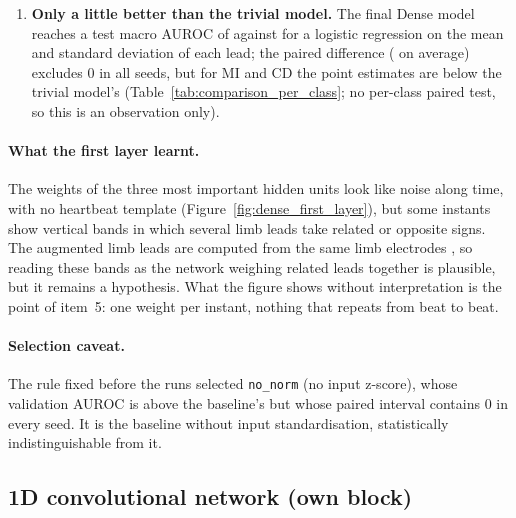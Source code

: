 \begin{enumerate}[leftmargin=1.4em,itemsep=2pt]
        loss reaches its minimum early and then rises, while the AUROC keeps improving for several
        more epochs. The network keeps ranking the records better while its probabilities become
        over-confident. Early stopping on the AUROC therefore stops later than a rule based on the
        loss would.
  \item \textbf{Only a little better than the trivial model.} The final Dense model reaches a test
        macro AUROC of \denseFinalTestMacroAurocMean{} against \trivialTestMacroAuroc{} for a logistic
        regression on the mean and standard deviation of each lead; the paired difference
        (\denseDiffTrivialMean{} on average) excludes 0 in all seeds, but for MI and CD the point
        estimates are below the trivial model's (Table~\ref{tab:comparison_per_class}; no per-class
        paired test, so this is an observation only).
\end{enumerate}

\paragraph{What the first layer learnt.} The weights of the three most important hidden units look
like noise along time, with no heartbeat template (Figure~\ref{fig:dense_first_layer}), but some
instants show vertical bands in which several limb leads take related or opposite signs. The
augmented limb leads are computed from the same limb electrodes \cite[p.~e263]{wagner2009aha}, so
reading these bands as the network weighing related leads together is plausible, but it remains a
hypothesis. What the figure shows without interpretation is the point of item~5: one weight per
instant, nothing that repeats from beat to beat.



\paragraph{Selection caveat.} The rule fixed before the runs selected \texttt{no\_norm}
(no input z-score), whose validation AUROC is above the baseline's but whose paired interval contains
0 in every seed. It is the baseline without input standardisation, statistically indistinguishable
from it.

\subsection{1D convolutional network (own block)}\label{sec:cnn}

